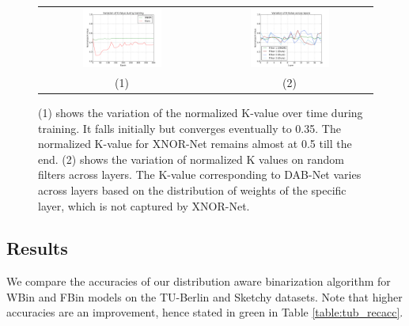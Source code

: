 \begin{figure}[t]
\begin{center}
\begin{tabular}{cc}
           \includegraphics[width=0.5\textwidth]{figures/figure_1.pdf} & 
           \includegraphics[width=0.5\textwidth]{figures/figure_3.pdf}\\
           (1) & (2)\\ 
\end{tabular}
\end{center}
\caption{(1) shows the variation of the normalized K-value over time during training. It falls initially but converges eventually to 0.35. The normalized K-value for XNOR-Net remains almost at 0.5 till the end. (2) shows the variation of normalized K values on random filters across layers. The K-value corresponding to DAB-Net varies across layers based on the distribution of weights of the specific layer, which is not captured by XNOR-Net.}
        \label{fig:alphabetaovertime}
\end{figure}

\subsection{Results}

\noindent We compare the accuracies of our distribution aware binarization algorithm for WBin and FBin models on the TU-Berlin and Sketchy datasets. Note that higher accuracies are an improvement, hence stated in green in Table \ref{table:tub_recacc}. \\

